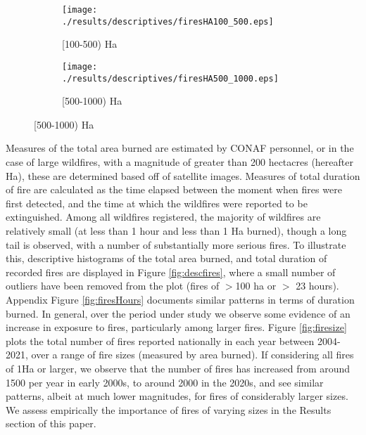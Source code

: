 \documentclass[11pt]{article}
\begin{document}
\begin{spacing}{1.5}
\begin{figure}[ht!]
    \begin{subfigure}{0.49\textwidth}
          \texttt{[image: ./results/descriptives/firesHA100\_500.eps]}
         \caption{[100-500) Ha}
    \end{subfigure}
    \begin{subfigure}{0.49\textwidth}
          \texttt{[image: ./results/descriptives/firesHA500\_1000.eps]}
         \caption{[500-1000) Ha}
    \end{subfigure}
\end{figure}

Measures of the total area burned are estimated by CONAF personnel, or in the case of large wildfires, with a magnitude of greater than 200 hectacres (hereafter Ha), these are determined based off of satellite images. Measures of total duration of fire are calculated as the time elapsed between the moment when fires were first detected, and the time at which the wildfires were reported to be extinguished.  Among all wildfires registered, the majority of wildfires are relatively small (at less than 1 hour and less than 1 Ha burned), though a long tail is observed, with a number of substantially more serious fires.  To illustrate this, descriptive histograms of the total area burned, and total duration of recorded fires are displayed in Figure \ref{fig:descfires}, where a small number of outliers have been removed from the plot (fires of $>$100 ha or $>$ 23 hours).  Appendix Figure \ref{fig:firesHours} documents similar patterns in terms of duration burned.  
In general, over the period under study we observe some evidence of an increase in exposure to fires, particularly among larger fires.  Figure \ref{fig:firesize} plots the total number of fires reported nationally in each year between 2004-2021, over a range of fire sizes (measured by area burned).  If considering all fires of 1Ha or larger, we observe that the number of fires has increased from around 1500 per year in early 2000s, to around 2000 in the 2020s, and see similar patterns, albeit at much lower magnitudes, for fires of considerably larger sizes.  We assess empirically the importance of fires of varying sizes in the Results section of this paper.



\end{spacing}
\end{document}
